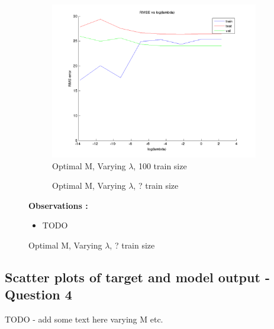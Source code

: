 \documentclass{article}
\begin{document}
\begin{figure}[H]
\begin{subfigure}{.5\textwidth}
\centering
\includegraphics[width=\linewidth]{D2/RMS_lambda_100}
\caption{Optimal M, Varying $\lambda$, 100 train size}
\end{subfigure}
\begin{subfigure}{.5\textwidth}
\caption{Optimal M, Varying $\lambda$, ? train size}
\end{subfigure}


\textbf{Observations :}

\begin{itemize}
\item TODO
\end{itemize}


\end{figure}



\subsection{Scatter plots of target and model output - Question 4}

TODO - add some text here varying M etc.
\end{document}
